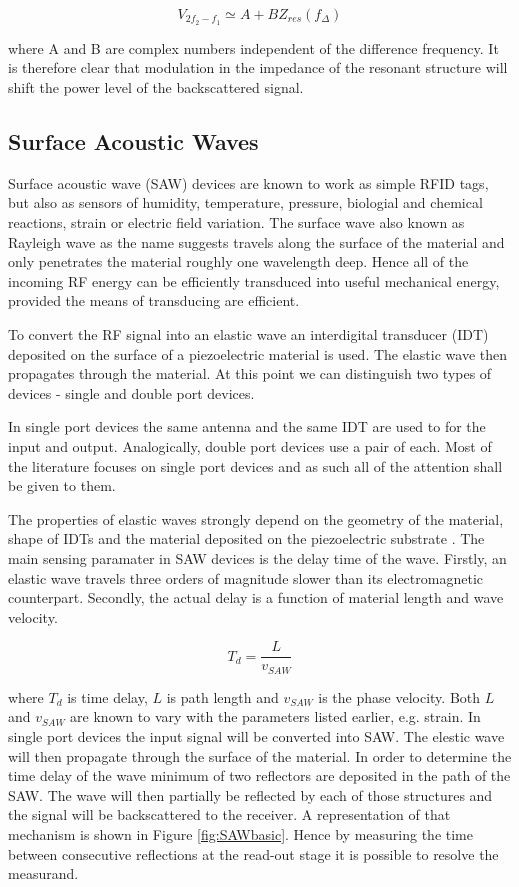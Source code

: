 \documentclass[11pt,a4paper]{article}
\begin{document}
\begin{equation}
V_{2f_2-f_1} \simeq A + BZ_{res}(f_{\Delta})
\end{equation}

where A and B are complex numbers independent of the difference frequency. It is therefore clear that modulation in the impedance of the resonant structure will shift the power level of the backscattered signal.

\subsection{Surface Acoustic Waves}

Surface acoustic wave (SAW) devices are known to work as simple RFID tags, but also as sensors of humidity, temperature, pressure, biologial and chemical reactions, strain or electric field variation. The surface wave also known as Rayleigh wave \cite{rayleigh} as the name suggests travels along the surface of the material and only penetrates the material roughly one wavelength deep. Hence all of the incoming RF energy can be efficiently transduced into useful mechanical energy, provided the means of transducing are efficient. 

To convert the RF signal into an elastic wave an interdigital transducer (IDT) deposited on the surface of a piezoelectric material is used. The elastic wave then propagates through the material. At this point we can distinguish two types of devices - single and double port devices.

In single port devices the same antenna and the same IDT are used to for the input and output. Analogically, double port devices use a pair of each. Most of the literature focuses on single port devices and as such all of the attention shall be given to them.

The properties of elastic waves strongly depend on the geometry of the material, shape of IDTs and the material deposited on the piezoelectric substrate \cite{SAWapps}. The main sensing paramater in SAW devices is the delay time of the wave. Firstly, an elastic wave travels three orders of magnitude slower than its electromagnetic counterpart. Secondly, the actual delay is a function of material length and wave velocity. 

\begin{equation}
T_d = \frac{L}{v_{SAW}}
\end{equation}

where $T_d$ is time delay, $L$ is path length and $v_{SAW}$ is the phase velocity. Both $L$ and $v_{SAW}$ are known to vary with the parameters listed earlier, e.g. strain. In single port devices the input signal will be converted into SAW. The elestic wave will then propagate through the surface of the material. In order to determine the time delay of the wave minimum of two reflectors are deposited in the path of the SAW. The wave will then partially be reflected by each of those structures and the signal will be backscattered to the receiver. A representation of that mechanism is shown in Figure \ref{fig:SAWbasic}. Hence by measuring the time between consecutive reflections at the read-out stage it is possible to resolve the measurand.
\end{document}
